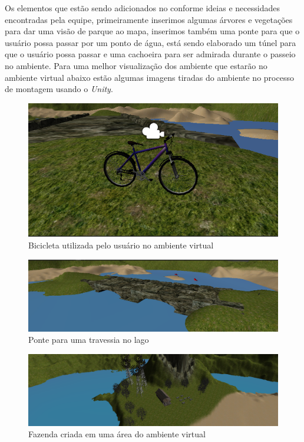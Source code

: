 Os elementos que estão sendo adicionados no conforme ideias e necessidades encontradas
pela equipe, primeiramente inserimos algumas árvores e vegetações para dar uma visão
de parque ao mapa, inserimos também uma ponte para que o usuário possa passar por um 
ponto de água, está sendo elaborado um túnel para que o usuário possa passar e uma 
cachoeira para ser admirada durante o passeio no ambiente. Para uma melhor visualização 
dos ambiente que estarão no ambiente virtual abaixo estão algumas imagens tiradas do ambiente
 no processo de montagem usando o \textit{Unity}.

\begin{figure}[htpb]
 \begin{center}
    \includegraphics[width=.60\textwidth]{figuras/bicycle.png}
 \end{center}
  \caption{Bicicleta utilizada pelo usuário no ambiente virtual}
  \label{fig:core_concurrent}
\end{figure}

\begin{figure}[htpb]
 \begin{center}
    \includegraphics[width=.60\textwidth]{figuras/bridge.png}
 \end{center}
  \caption{Ponte para uma travessia no lago}
  \label{fig:core_concurrent}
\end{figure}

\begin{figure}[htpb]
 \begin{center}
    \includegraphics[width=.60\textwidth]{figuras/farm.png}
 \end{center}
  \caption{Fazenda criada em uma área do ambiente virtual}
  \label{fig:core_concurrent}
\end{figure}

